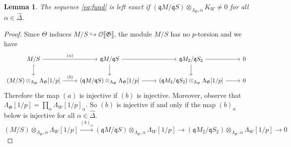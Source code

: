 \documentclass[leqno]{amsart}
\newtheorem{lem}[thm]{Lemma}
\theoremstyle{definition}
\theoremstyle{remark}
\newcommand{\oo}{\mathcal{O}}
\newcommand{\fq}{\mathfrak{q}}
\newcommand{\fG}{\mathfrak{G}}
\begin{document}
\begin{lem}\label{lem:inj_crit}
The sequence \eqref{eq:fund}
is left exact if 
$(\fq M/\fq S)\otimes_{\Lambda_\fG,\alpha}K_W\neq 0$
for all $\alpha\in\hat{\Delta}$.
\end{lem}
\begin{proof}
Since $\Theta$ induces $M/S\hookrightarrow
\oo\llbracket\fG\rrbracket$,
the module $M/S$ has no $p$-torsion
and we have
\[
\begin{tikzcd}
M/S
\arrow[r,"(a)"]\arrow[d,hookrightarrow] &
\fq M/\fq S
\arrow[r]\arrow[d] &
\fq M_2/\fq S_2
\arrow[r]\arrow[d] & 0\\
(M/S)\otimes_{\Lambda_\fG}\Lambda_\fG[1/p]
\arrow[r,"(b)"] &
(\fq M/\fq S)\otimes_{\Lambda_\fG}\Lambda_\fG[1/p]
\arrow[r] &
(\fq M_2/\fq S_2)\otimes_{\Lambda_\fG}\Lambda_\fG[1/p]
\arrow[r] & 0
\end{tikzcd}
\]
Therefore the map $(a)$ is injective if
$(b)$ is injective.
Moreover, observe that 
$\Lambda_\fG[1/p]=\prod_\alpha \Lambda_W[1/p]_\alpha$.
So $(b)$ is injective if and only if the map $(b)_\alpha$ below
is injective for all $\alpha\in\hat{\Delta}$.
\[
(M/S)\otimes_{\Lambda_\fG,\alpha}\Lambda_W[1/p]
\xrightarrow{(b)_\alpha}
(\fq M/\fq S)\otimes_{\Lambda_\fG,\alpha}\Lambda_W[1/p]
\to
(\fq M_2/\fq S_2)\otimes_{\Lambda_\fG,\alpha}\Lambda_W[1/p]\to 0
\]


\end{proof}
\end{document}
